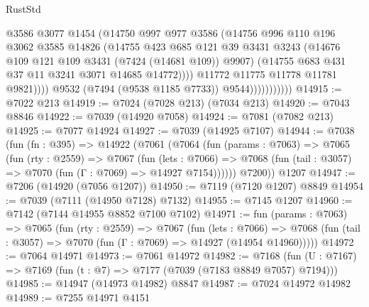 \begin{lexlean}{RustStd}
\begin{coremodule}
                                  @3586
                                  @3077
                                  @1454
                                  (@14750
                                    @997
                                    @977
                                    @3586
                                    (@14756
                                      @996
                                      @110
                                      @196
                                      @3062
                                      @3585
                                      @14826
                                      (@14755
                                        @423
                                        @685
                                        @121
                                        @39
                                        @3431
                                        @3243
                                        (@14676 @109 @121 @109 @3431 (@7424 (@14681 @109)) @9907)
                                        (@14755 @683 @431 @37 @11 @3241 @3071 @14685 @14772))))
                                  @11772
                                  @11775
                                  @11778
                                  @11781
                                  @9821))))
                          @9532
                          (@7494 (@9538 @1185 @7733))
                          @9544)))))))))))
@14915 := @7022 @213
@14919 := @7024 (@7028 @213) (@7034 @213)
@14920 := @7043 @8846
@14922 := @7039 (@14920 @7058)
@14924 := @7081 (@7082 @213)
@14925 := @7077 @14924
@14927 := @7039 (@14925 @7107)
@14944 := @7038
    (fun (fn : @395) =>
    @14922
      (@7061
        (@7064
          (fun (params : @7063) =>
          @7065
            (fun (rty : @2559) =>
            @7067
              (fun (lets : @7066) =>
              @7068 (fun (tail : @3057) => @7070 (fun (Γ : @7069) => @14927 @7154))))))
        @7200))
    @1207
@14947 := @7206 (@14920 (@7056 @1207))
@14950 := @7119 (@7120 @1207) @8849
@14954 := @7039 (@7111 (@14950 @7128) @7132)
@14955 := @7145 @1207
@14960 := @7142 (@7144 @14955 @8852 @7100 @7102)
@14971 := fun (params : @7063) =>
  @7065
    (fun (rty : @2559) =>
    @7067
      (fun (lets : @7066) =>
      @7068 (fun (tail : @3057) => @7070 (fun (Γ : @7069) => @14927 (@14954 @14960)))))
@14972 := @7064 @14971
@14973 := @7061 @14972
@14982 := @7168 (fun (U : @7167) => @7169 (fun (t : @7) => @7177 (@7039 (@7183 @8849 @7057) @7194)))
@14985 := @14947 (@14973 @14982) @8847
@14987 := @7024 @14972 @14982
@14989 := @7255 @14971 @4151

\end{coremodule}
\end{lexlean}
